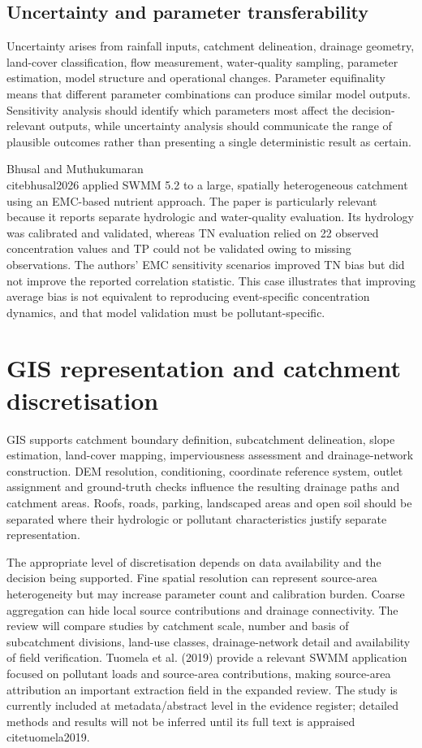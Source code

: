 \documentclass[journal]{IEEEtran}
\begin{document}
\subsection{Uncertainty and parameter transferability}
Uncertainty arises from rainfall inputs, catchment delineation, drainage geometry, land-cover classification, flow measurement, water-quality sampling, parameter estimation, model structure and operational changes. Parameter equifinality means that different parameter combinations can produce similar model outputs. Sensitivity analysis should identify which parameters most affect the decision-relevant outputs, while uncertainty analysis should communicate the range of plausible outcomes rather than presenting a single deterministic result as certain.

Bhusal and Muthukumaran \\cite{bhusal2026} applied SWMM 5.2 to a large, spatially heterogeneous catchment using an EMC-based nutrient approach. The paper is particularly relevant because it reports separate hydrologic and water-quality evaluation. Its hydrology was calibrated and validated, whereas TN evaluation relied on 22 observed concentration values and TP could not be validated owing to missing observations. The authors' EMC sensitivity scenarios improved TN bias but did not improve the reported correlation statistic. This case illustrates that improving average bias is not equivalent to reproducing event-specific concentration dynamics, and that model validation must be pollutant-specific.

\section{GIS representation and catchment discretisation}
GIS supports catchment boundary definition, subcatchment delineation, slope estimation, land-cover mapping, imperviousness assessment and drainage-network construction. DEM resolution, conditioning, coordinate reference system, outlet assignment and ground-truth checks influence the resulting drainage paths and catchment areas. Roofs, roads, parking, landscaped areas and open soil should be separated where their hydrologic or pollutant characteristics justify separate representation.

The appropriate level of discretisation depends on data availability and the decision being supported. Fine spatial resolution can represent source-area heterogeneity but may increase parameter count and calibration burden. Coarse aggregation can hide local source contributions and drainage connectivity. The review will compare studies by catchment scale, number and basis of subcatchment divisions, land-use classes, drainage-network detail and availability of field verification. Tuomela et al. (2019) provide a relevant SWMM application focused on pollutant loads and source-area contributions, making source-area attribution an important extraction field in the expanded review. The study is currently included at metadata/abstract level in the evidence register; detailed methods and results will not be inferred until its full text is appraised \\cite{tuomela2019}.
\end{document}

